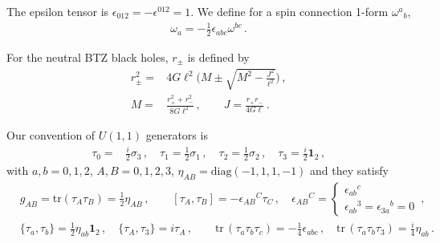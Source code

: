 \documentclass[11pt]{article}
\newcommand{\tr}{\mbox{tr}}
\numberwithin{equation}{section}
\begin{document}
The epsilon tensor is $\epsilon_{012}=-\epsilon^{012}=1$.
We define for a spin connection 1-form $\omega^a{}_b$,
\begin{align}
  \omega_a= - \frac{1}{2}\epsilon_{abc} \omega^{bc} \,.
\end{align}

For the neutral BTZ black holes, $r_\pm$ is defined by
\begin{align}
  r_\pm^2 =& 4 G \ell^2 \bigg( M \pm \sqrt{M^2-\frac{J^2}{\ell^2} }\bigg) \,,\\
M=& \frac{r_+^2+r_-^2}{8G \ell^2} \,,
\qquad
J= \frac{r_+r_-}{4G \ell} \,.
\end{align}


Our convention of $U(1,1)$ generators is
\begin{align}
  \tau_0 =& \frac{i}{2}\sigma_3 
\,, \quad
  \tau_1 = \frac{1}{2}\sigma_1 
 \,,\quad
   \tau_2 = \frac{1}{2}\sigma_2 
\,,\quad
  \tau_3 = \frac{i}{2}\bm{1}_2 
\,,
\label{eq:SL22R_gen}
\end{align}
with $a,b=0,1,2$, $A,B=0,1,2,3$, $\eta_{AB}=\text{diag}(-1,1,1,-1)$
and they satisfy
\begin{align}
&
  g_{AB} = \tr(\tau_A\tau_B) = \frac{1}{2}\eta_{AB} \,,
\qquad
[\tau_A,\tau_B] = - \epsilon_{AB}{}^C \tau_C \,,
\quad
\epsilon_{AB}{}^C=
  \begin{cases}
    \epsilon_{ab}{}^c \\ \epsilon_{ab}{}^3=\epsilon_{3a}{}^b=0
  \end{cases}
\,,\\&
\{ \tau_a, \tau_b \} = \frac{1}{2} \eta_{ab}\mathbf{1}_2 \,,
\quad
\{ \tau_A, \tau_3 \} = i \tau_A \,,
\qquad
\tr \, (\tau_a\tau_b\tau_c) = - \frac{1}{4} \epsilon_{abc} \,,
\quad
\tr \, (\tau_a \tau_b \tau_3)= \frac{i}{4} \eta_{ab} \,.
\end{align}
\end{document}
